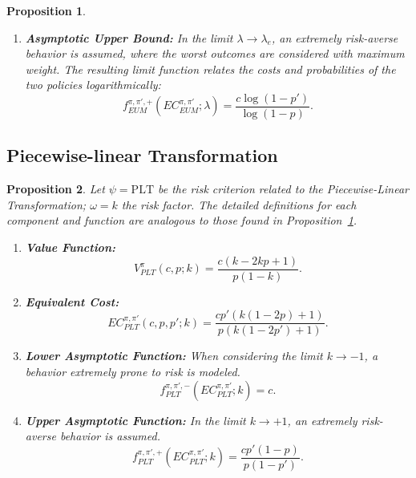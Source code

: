 \documentclass[runningheads]{llncs}
\newtheorem{proposition}{Proposition}
\begin{document}
\begin{proposition}
\begin{enumerate}
        \item \textbf{Asymptotic Upper Bound:} In the limit $\lambda \to \lambda_e$, an extremely risk-averse behavior is assumed, where the worst outcomes are considered with maximum weight. The resulting limit function relates the costs and probabilities of the two policies logarithmically:
        \begin{equation}
            f^{\pi, \pi', +}_{EUM}(EC^{\pi, \pi'}_{EUM}; \lambda) = \frac{c \log(1-p')}{\log(1-p)}.
        \end{equation}
    \end{enumerate}
\label{prop:osma-eum}
\end{proposition}


\subsection{Piecewise-linear Transformation}

\begin{proposition}\label{prop:osma-plt}
    Let $\psi = \text{PLT}$ be the risk criterion related to the \textit{Piecewise-Linear Transformation}; $\omega = k$ the risk factor. The detailed definitions for each component and function are analogous to those found in Proposition~\ref{prop:osma-eum}.
    \begin{enumerate}
        \item \textbf{Value Function:}
        \begin{equation}
            V^{\pi}_{PLT}(c, p; k) = \frac{c (k - 2kp + 1)}{p (1 - k)}.
        \end{equation}
        
        \item \textbf{Equivalent Cost:}
        \begin{equation}
        EC^{\pi, \pi'}_{PLT}(c, p, p'; k) =  \frac
                    {c p' (k (1 - 2 p) + 1)}
                    {p (k (1 - 2 p') + 1)}.
        \end{equation}
        
        \item \textbf{Lower Asymptotic Function:} When considering the limit $k \to -1$, a behavior extremely prone to risk is modeled.
        \begin{equation}
            f^{\pi, \pi', -}_{PLT}(EC^{\pi, \pi'}_{PLT}; k) = c.
        \end{equation}
        
        \item \textbf{Upper Asymptotic Function:} In the limit $k \to +1$, an extremely risk-averse behavior is assumed.
        \begin{equation}
            f^{\pi, \pi', +}_{PLT}(EC^{\pi, \pi'}_{PLT}; k) = 
            \frac
            {c p' (1 - p)}
            {p (1 - p')}.
        \end{equation}
    \end{enumerate}
\end{proposition}
\end{document}
